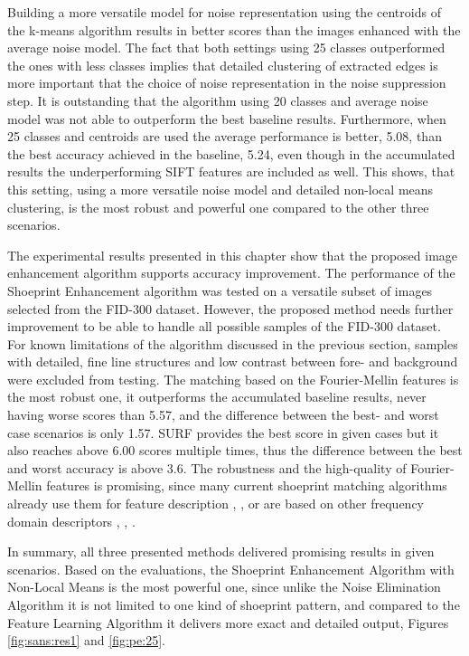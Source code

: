 \documentclass[draft,final]{vutinfth} %
\begin{document}
Building a more versatile model for noise representation using the centroids of the k-means algorithm results in better scores than the images enhanced with the average noise model.
The fact that both settings using 25 classes outperformed the ones with less classes implies that detailed clustering of extracted edges is more important that the  choice of noise representation in the noise suppression step.
It is outstanding that the algorithm using 20 classes and average noise model was not able to outperform the best baseline results.
Furthermore, when 25 classes and centroids are used the average performance is better, 5.08, than the best accuracy achieved in the baseline, 5.24, even though in the accumulated results the underperforming SIFT features are included as well.
This shows, that this setting, using a more versatile noise model and detailed non-local means clustering, is the most robust and powerful one compared to the other three scenarios.
\par
The experimental results presented in this chapter show that the proposed image enhancement algorithm supports accuracy improvement.
The performance of the Shoeprint Enhancement  algorithm was tested on a versatile subset of images selected from the FID-300 dataset.
However, the proposed method needs further improvement to be able to handle all possible samples of the FID-300 dataset.
For known limitations of the algorithm discussed in the previous section, samples with detailed, fine line structures and low contrast between fore- and background were excluded from testing.
The matching based on the Fourier-Mellin features is the most robust one, it outperforms the accumulated baseline results, never having worse scores than 5.57, and the difference between the best- and worst case scenarios is only 1.57.
SURF provides the best score in given cases but it also reaches above 6.00 scores multiple times, thus the difference between the best and worst accuracy is above 3.6.
The robustness and the high-quality of Fourier-Mellin features is promising, since many current shoeprint matching algorithms already use them for feature description  \cite{gueham2008automatic}, \cite{richetelli2017classification}, \cite{wu2019crime} or are based on other frequency domain descriptors \cite{algarni2008novel}, \cite{wang2014automatic}, \cite{katireddy2017novel}. 
\par
In summary, all three presented methods delivered promising results in given scenarios.
Based on the evaluations, the Shoeprint Enhancement Algorithm with Non-Local Means is the most powerful one, since unlike the Noise Elimination Algorithm it is not limited to one kind of shoeprint pattern, and compared to the Feature Learning Algorithm it delivers more exact and detailed output, Figures \ref{fig:sans:res1} and \ref{fig:pe:25}.
\end{document}
